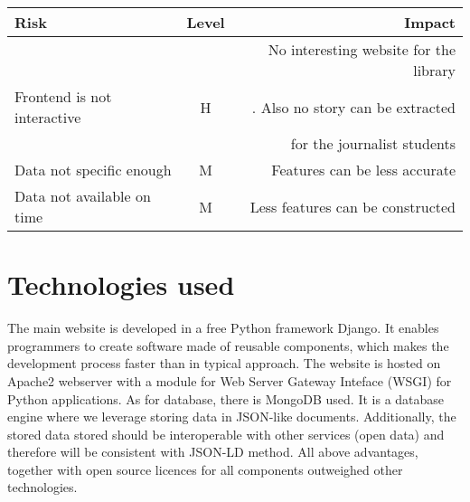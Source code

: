 \begin{center}
  \begin{tabular}{ l | c | r  }
    \hline
    Risk & Level & Impact \\ \hline
   & & No interesting website for the library\\
      Frontend is not interactive & H & . Also no story can be extracted\\
    & &  for the journalist students \\
    Data not specific enough & M & Features can be less accurate \\
    Data not available on time & M & Less features can be constructed\\
  \end{tabular}
\end{center}

\section{Technologies used}

The main website is developed in a free Python framework Django. It enables programmers to create software made of reusable components, which makes the development process faster than in typical approach. The website is hosted on Apache2 webserver with a module for Web Server Gateway Inteface (WSGI) for Python applications. As for database, there is MongoDB used. It is a database engine where we leverage storing data in JSON-like documents. Additionally, the stored data stored should be interoperable with other services (open data) and therefore will be consistent with JSON-LD method. All above advantages, together with open source licences for all components outweighed other technologies.


